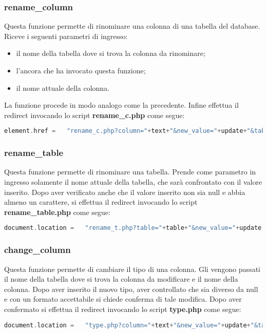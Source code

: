 \subsubsection{rename\_column}
Questa funzione permette di rinominare una colonna di una tabella del database.
Riceve i seguenti parametri di ingresso:
\begin{itemize}
	\item il nome della tabella dove si trova la colonna da rinominare;
	\item l'ancora che ha invocato questa funzione;
	\item il nome attuale della colonna.
\end{itemize}
La funzione procede in modo analogo come la precedente.
Infine effettua il redirect invocando lo script \textbf{ rename\_c.php} come segue:

\begin{lstlisting}[language=PHP]
element.href =   "rename_c.php?column="+text+"&new_value="+update+"&table="+table ;
\end{lstlisting}

\subsubsection{rename\_table}
Questa funzione permette di rinominare una tabella.
Prende come parametro in ingresso solamente il nome attuale della tabella, che sarà confrontato con il valore inserito. Dopo aver verificato anche che il valore inserito non sia null e abbia almeno un carattere, si effettua il redirect invocando lo script \textbf{rename\_table.php} come segue:
\begin{lstlisting}[language=PHP]
document.location =   "rename_t.php?table="+table+"&new_value="+update;     
\end{lstlisting}

\subsubsection{change\_column}
Questa funzione permette di cambiare il tipo di una colonna. Gli vengono passati il nome della tabella dove si trova la colonna da modificare e il nome della colonna. \newline Dopo aver inserito il nuovo tipo, aver controllato che sia diverso da null e con un formato accettabile si chiede conferma di tale modifica.
Dopo aver confermato si effettua il redirect invocando lo script \textbf{type.php} come segue:
\begin{lstlisting}[language=PHP]
document.location =   "type.php?column="+text+"&new_value="+update+"&table="+table ;        
\end{lstlisting}
